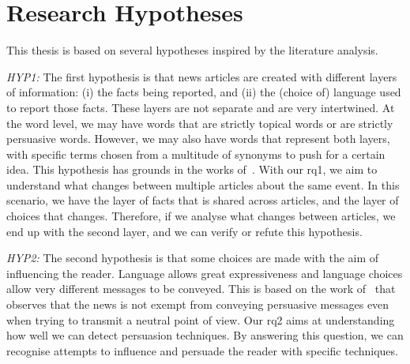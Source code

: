 \section{\statusgreen Research Hypotheses}
\label{sec:intro_hyp}

This thesis is based on several hypotheses inspired by the literature analysis.

\emph{HYP1:} The first hypothesis is that news articles are created with different layers of information: (i) the facts being reported, and (ii) the (choice of) language used to report those facts.
These layers are not separate and are very intertwined. At the word level, we may have words that are strictly topical words or are strictly persuasive words. However, we may also have words that represent both layers, with specific terms chosen from a multitude of synonyms to push for a certain idea.
This hypothesis has grounds in the works of~\citet{jenkins2013thin,vanderwicken1995news,jang2023proximate,bountouridis2018explaining}.
With our \acrshort{rq}1, we aim to understand what changes between multiple articles about the same event. In this scenario, we have the layer of facts that is shared across articles, and the layer of choices that changes. Therefore, if we analyse what changes between articles, we end up with the second layer, and we can verify or refute this hypothesis.

\emph{HYP2:} The second hypothesis is that some choices are made with the aim of influencing the reader. Language allows great expressiveness and language choices allow very different messages to be conveyed. This is based on the work of~\citet{gass2018persuasion} that observes that the news is not exempt from conveying persuasive messages even when trying to transmit a neutral point of view.
Our \acrshort{rq}2 aims at understanding how well we can detect persuasion techniques. By answering this question, we can recognise attempts to influence and persuade the reader with specific techniques.

